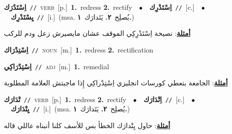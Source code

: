 \documentclass[10pt,a4paper,twoside]{article} %
\begin{document}
\begin{multicols}{2}
{\setlength\topsep{0pt}\textbf{\foreignlanguage{arabic}{اِسْتَدْرَك}}\ {\color{gray}\texttt{//}\color{black}}\ \textsc{verb}\ [p.]\ \textbf{1.}~redress  \textbf{2.}~rectify\ \ $\bullet$\ \ \setlength\topsep{0pt}\textbf{\foreignlanguage{arabic}{اِسْتَدْرِك}}\ {\color{gray}\texttt{//}\color{black}}\ [c.]\ \ $\bullet$\ \ \setlength\topsep{0pt}\textbf{\foreignlanguage{arabic}{يِسْتَدْرِك}}\ {\color{gray}\texttt{//}\color{black}}\ [i.]\ \color{gray}(msa. \foreignlanguage{arabic}{يُصلِح}~\foreignlanguage{arabic}{\textbf{٢.}}  \foreignlanguage{arabic}{يَتَدارَك}~\foreignlanguage{arabic}{\textbf{١.}})\color{black}\  \begin{flushright}\color{gray}\foreignlanguage{arabic}{\textbf{\underline{\foreignlanguage{arabic}{أمثلة}}}: نصيحة اِسْتَدْرِكِي الموقف عشان مايصيرش زعل ودم للركب}\end{flushright}\color{black}} \vspace{2mm}

{\setlength\topsep{0pt}\textbf{\foreignlanguage{arabic}{اِسْتِدْرَاك}}\ {\color{gray}\texttt{//}\color{black}}\ \textsc{noun}\ [m.]\ \textbf{1.}~redress  \textbf{2.}~rectification\ } \vspace{2mm}

{\setlength\topsep{0pt}\textbf{\foreignlanguage{arabic}{اِسْتِدْرَاكِي}}\ {\color{gray}\texttt{//}\color{black}}\ \textsc{adj}\ [m.]\ \textbf{1.}~remedial\  \begin{flushright}\color{gray}\foreignlanguage{arabic}{\textbf{\underline{\foreignlanguage{arabic}{أمثلة}}}: الجامعة بتعطي كورسات انجليزي اِسْتِدْراكِي إِذا ماجبتش العلامة المطلوبة}\end{flushright}\color{black}} \vspace{2mm}

{\setlength\topsep{0pt}\textbf{\foreignlanguage{arabic}{تْدَارَك}}\ {\color{gray}\texttt{//}\color{black}}\ \textsc{verb}\ [p.]\ \textbf{1.}~redress  \textbf{2.}~rectify\ \ $\bullet$\ \ \setlength\topsep{0pt}\textbf{\foreignlanguage{arabic}{اِتْدَارَك}}\ {\color{gray}\texttt{//}\color{black}}\ [c.]\ \ $\bullet$\ \ \setlength\topsep{0pt}\textbf{\foreignlanguage{arabic}{يِتْدَارَك}}\ {\color{gray}\texttt{//}\color{black}}\ [i.]\ \color{gray}(msa. \foreignlanguage{arabic}{يُصلِح}~\foreignlanguage{arabic}{\textbf{٢.}}  \foreignlanguage{arabic}{يَتَدارَك}~\foreignlanguage{arabic}{\textbf{١.}})\color{black}\  \begin{flushright}\color{gray}\foreignlanguage{arabic}{\textbf{\underline{\foreignlanguage{arabic}{أمثلة}}}: حاول يِتْدارَك الخطأ بس للأسف كلنا أنبناه عاللي قاله}\end{flushright}\color{black}} \vspace{2mm}


\end{multicols}
\end{document}
